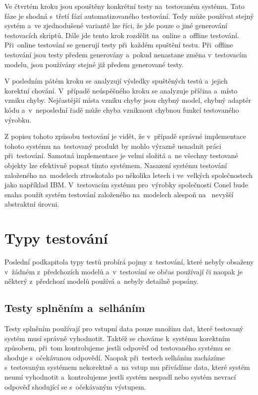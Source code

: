 Ve čtvrtém kroku jsou spouštěny konkrétní testy na~testovaném systému. Tato fáze je shodná s~třetí fází automatizovaného testování. Tedy může používat stejný systém a~ve zjednodušené variantě lze říci, že jde pouze o jiné generování testovacích skriptů. Dále jde tento krok rozdělit na~online a~offline testování. Při~online testování se generují testy při~každém spuštění testu. Při~offline testování jsou testy předem generovány a~pokud nenastane změna v~testovacím modelu, jsou používány stejné již předem generované testy.

V posledním pátém kroku se analyzují výsledky spuštěných testů a~jejich korektní chování. V~případě neúspěšného kroku se analyzuje příčina a~místo vzniku chyby. Nejčastější místa vzniku chyby jsou chybný model, chybný adaptér kódu a~v~neposlední řadě může chyba vzniknout chybnou funkcí testovaného výrobku.

Z popisu tohoto způsobu testování je vidět, že v~případě správné implementace tohoto systému na~testovaný produkt by mohlo výrazně usnadnit práci při~testování. Samotná implementace je velmi složitá a~ne všechny testované objekty lze efektivně popsat tímto systémem. Nasazení systému testování založeného na~modelech ztroskotalo po několika letech i ve~velkých společnostech jako například IBM. V~testovacím systému pro~výrobky společnosti Conel bude snaha použít systém testování založeného na~modelech alespoň  na~ nevyšší abstraktní úrovni. \cite{MBT3}

\section{Typy testování}
Poslední podkapitola typy testů probírá pojmy z~testování, které nebyly obsaženy v~žádném z~předchozích modelů a~v~testování se občas používají či naopak je některý z~předchozí modelů používá a~nebyly detailně popsány.

\subsection{Testy splněním a~selháním}
Testy splněním používají pro vstupní data pouze množinu dat, které testovaný systém musí správně vyhodnotit. Taktéž se chováme k~systému korektním způsobem, při~tom kontrolujeme jestli odpověď od testovaného systému se shoduje s~očekávanou odpovědí. Naopak při~testech selháním zacházíme s~testovaným systémem nekorektně a~na vstup mu přivádíme data, které systém neumí vyhodnotit a~kontrolujeme jestli systém nespadl nebo systém nevrací odpověď shodující se s~očekávaným výstupem.

